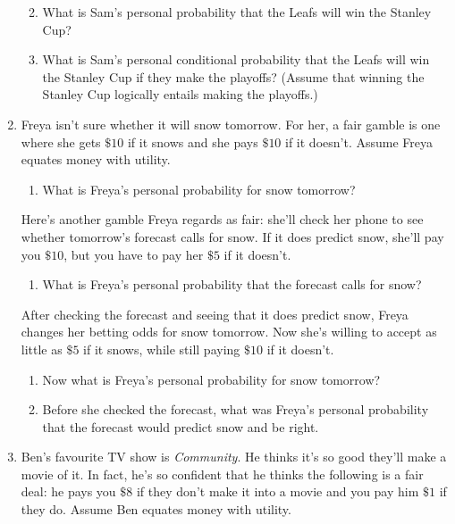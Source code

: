 \documentclass[justified]{tufte-book}
\providecommand{\tightlist}{%
  \setlength{\itemsep}{0pt}\setlength{\parskip}{0pt}}
\theoremstyle{definition}
\theoremstyle{definition}
\theoremstyle{definition}
\theoremstyle{remark}
\begin{document}
\begin{enumerate}
  \begin{enumerate}
  \def\labelenumii{\alph{enumii}.}
  \setcounter{enumii}{1}
  \tightlist
  \item
    What is Sam's personal probability that the Leafs will win the
    Stanley Cup?
  \item
    What is Sam's personal conditional probability that the Leafs will
    win the Stanley Cup if they make the playoffs? (Assume that winning
    the Stanley Cup logically entails making the playoffs.)
  \end{enumerate}
\item
  Freya isn't sure whether it will snow tomorrow. For her, a fair gamble
  is one where she gets \(\$10\) if it snows and she pays \(\$10\) if it
  doesn't. Assume Freya equates money with utility.

  \begin{enumerate}
  \def\labelenumii{\alph{enumii}.}
  \tightlist
  \item
    What is Freya's personal probability for snow tomorrow?
  \end{enumerate}

  Here's another gamble Freya regards as fair: she'll check her phone to
  see whether tomorrow's forecast calls for snow. If it does predict
  snow, she'll pay you \(\$10\), but you have to pay her \(\$5\) if it
  doesn't.

  \begin{enumerate}
  \def\labelenumii{\alph{enumii}.}
  \setcounter{enumii}{1}
  \tightlist
  \item
    What is Freya's personal probability that the forecast calls for
    snow?
  \end{enumerate}

  After checking the forecast and seeing that it does predict snow,
  Freya changes her betting odds for snow tomorrow. Now she's willing to
  accept as little as \(\$5\) if it snows, while still paying \(\$10\)
  if it doesn't.

  \begin{enumerate}
  \def\labelenumii{\alph{enumii}.}
  \setcounter{enumii}{2}
  \tightlist
  \item
    Now what is Freya's personal probability for snow tomorrow?
  \item
    Before she checked the forecast, what was Freya's personal
    probability that the forecast would predict snow and be right.
  \end{enumerate}
\item
  Ben's favourite TV show is \emph{Community}. He thinks it's so good
  they'll make a movie of it. In fact, he's so confident that he thinks
  the following is a fair deal: he pays you \(\$8\) if they don't make
  it into a movie and you pay him \(\$1\) if they do. Assume Ben equates
  money with utility.


\end{enumerate}
\end{document}
